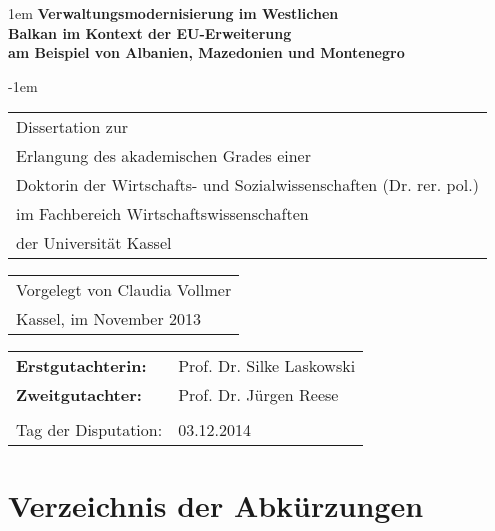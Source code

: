 \newpage
\setlength{\voffset}{20mm}
\openup 1em
{\LARGE \bfseries Verwaltungsmodernisierung im Westlichen\\ Balkan im Kontext der EU-Erweiterung\\am Beispiel von Albanien, Mazedonien und Montenegro}\par
\openup -1em
\vspace{70mm}
\begin{large}
\begin{tabular}{p{180mm}}
Dissertation zur \\
Erlangung des akademischen Grades einer \\
Doktorin der Wirtschafts- und Sozialwissenschaften (Dr. rer. pol.) \\
im Fachbereich Wirtschaftswissenschaften\\
der Universität Kassel\\
\end{tabular}

\vspace{1cm}

\begin{tabular}{p{24cm}}
Vorgelegt von Claudia Vollmer\\
Kassel, im November 2013\\
\end{tabular}
\newpage
\vspace{1cm}

\begin{tabular}{ll}
{\bf Erstgutachterin:} &  Prof. Dr. Silke Laskowski\\
{\bf Zweitgutachter:}&Prof. Dr. Jürgen Reese\\\\
Tag der Disputation:& 03.12.2014\\
\end{tabular}
\end{large}
\clearpage
\setlength{\voffset}{0mm}
%

%

%
  
\pagestyle{useheadings} 
\tableofcontents
\newpage
\listoffigures
\newpage
\listoftables
\newpage
\pagestyle{plain}
\chapter*{Verzeichnis der Abkürzungen}

